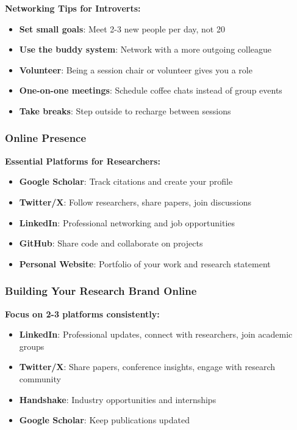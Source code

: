\documentclass[11pt,a4paper]{article}
\begin{document}
\textbf{Networking Tips for Introverts:}
\begin{itemize}
    \item \textbf{Set small goals}: Meet 2-3 new people per day, not 20
    \item \textbf{Use the buddy system}: Network with a more outgoing colleague
    \item \textbf{Volunteer}: Being a session chair or volunteer gives you a role
    \item \textbf{One-on-one meetings}: Schedule coffee chats instead of group events
    \item \textbf{Take breaks}: Step outside to recharge between sessions
\end{itemize}

\subsubsection{Online Presence}

\textbf{Essential Platforms for Researchers:}
\begin{itemize}
    \item \textbf{Google Scholar}: Track citations and create your profile
    \item \textbf{Twitter/X}: Follow researchers, share papers, join discussions
    \item \textbf{LinkedIn}: Professional networking and job opportunities
    \item \textbf{GitHub}: Share code and collaborate on projects
    \item \textbf{Personal Website}: Portfolio of your work and research statement
\end{itemize}

\subsubsection{Building Your Research Brand Online}

\begin{tcolorbox}[colback=green!5,colframe=green!50,title={Strategic Platform Use}]
\textbf{Focus on 2-3 platforms consistently:}
\begin{itemize}[leftmargin=1.5em]
    \item \textbf{LinkedIn}: Professional updates, connect with researchers, join academic groups
    \item \textbf{Twitter/X}: Share papers, conference insights, engage with research community
    \item \textbf{Handshake}: Industry opportunities and internships
    \item \textbf{Google Scholar}: Keep publications updated
\end{itemize}
\end{tcolorbox}
\end{document}
